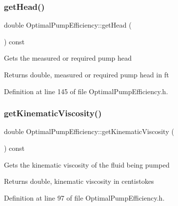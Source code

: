 \mbox{\label{class_optimal_pump_efficiency_af31fdb10aabc197ff7536c9bbe006573}} 
\subsubsection{\texorpdfstring{get\+Head()}{getHead()}}
{\footnotesize\ttfamily double Optimal\+Pump\+Efficiency\+::get\+Head (\begin{DoxyParamCaption}{ }\end{DoxyParamCaption}) const\hspace{0.3cm}{\ttfamily [inline]}}

Gets the measured or required pump head \begin{DoxyReturn}{Returns}
double, measured or required pump head in ft 
\end{DoxyReturn}


Definition at line 145 of file Optimal\+Pump\+Efficiency.\+h.

\mbox{\label{class_optimal_pump_efficiency_a8c2f7fcacce2b42ed83f29aec2d4671e}} 
\subsubsection{\texorpdfstring{get\+Kinematic\+Viscosity()}{getKinematicViscosity()}}
{\footnotesize\ttfamily double Optimal\+Pump\+Efficiency\+::get\+Kinematic\+Viscosity (\begin{DoxyParamCaption}{ }\end{DoxyParamCaption}) const\hspace{0.3cm}{\ttfamily [inline]}}

Gets the kinematic viscosity of the fluid being pumped \begin{DoxyReturn}{Returns}
double, kinematic viscosity in centistokes 
\end{DoxyReturn}


Definition at line 97 of file Optimal\+Pump\+Efficiency.\+h.

\mbox{\label{class_optimal_pump_efficiency_a58e8a430ced612e0518abd07fb30b085}} 
